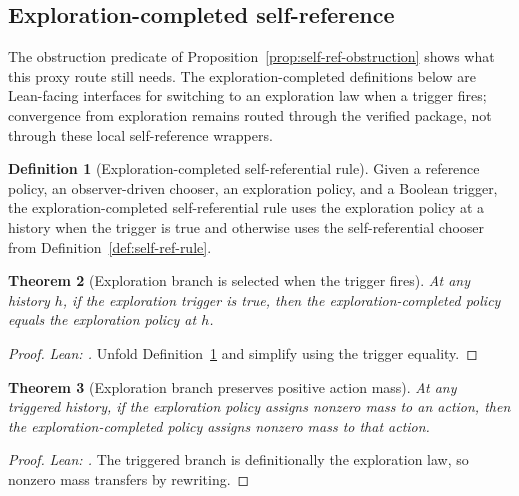 \documentclass[11pt]{article}
\newtheorem{theorem}{Theorem}[section]
\theoremstyle{definition}
\newtheorem{definition}[theorem]{Definition}
\theoremstyle{remark}
\theoremstyle{plain}
\theoremstyle{definition}
\begin{document}
\subsection{Exploration-completed self-reference}
\label{sec:self-ref-exploration}

The obstruction predicate of Proposition~\ref{prop:self-ref-obstruction} shows what this proxy route still needs. The exploration-completed definitions below are Lean-facing interfaces for switching to an exploration law when a trigger fires; convergence from exploration remains routed through the verified package, not through these local self-reference wrappers.

\begin{definition}[Exploration-completed self-referential rule]
\label{def:self-ref-exploratory}
Given a reference policy, an observer-driven chooser, an exploration policy, and a Boolean trigger, the exploration-completed self-referential rule uses the exploration policy at a history when the trigger is true and otherwise uses the self-referential chooser from Definition~\ref{def:self-ref-rule}.
\end{definition}

\begin{theorem}[Exploration branch is selected when the trigger fires]
\label{thm:self-ref-exploratory}
At any history $h$, if the exploration trigger is true, then the exploration-completed policy equals the exploration policy at $h$.
\end{theorem}

\begin{proof}
\noindent\emph{Lean: .}
Unfold Definition~\ref{def:self-ref-exploratory} and simplify using the trigger equality.
\end{proof}


\begin{theorem}[Exploration branch preserves positive action mass]
\label{thm:self-ref-exploratory-rate}
At any triggered history, if the exploration policy assigns nonzero mass to an action, then the exploration-completed policy assigns nonzero mass to that action.
\end{theorem}

\begin{proof}
\noindent\emph{Lean: .}
The triggered branch is definitionally the exploration law, so nonzero mass transfers by rewriting.
\end{proof}
\end{document}
